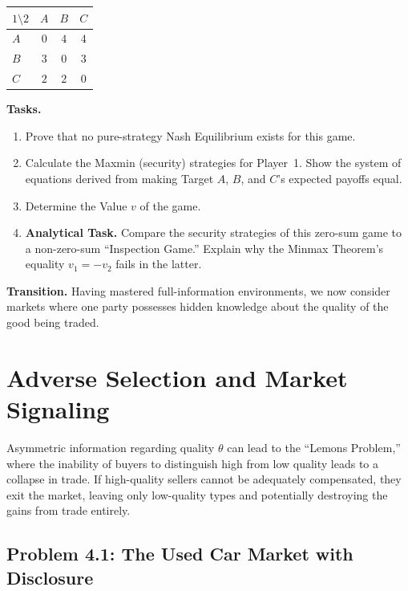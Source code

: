 \documentclass[12pt,a4paper]{article}
\begin{document}
\begin{table}[h!]
  \centering
  \renewcommand{\arraystretch}{1.1}
  \begin{tabular}{lccc}
    \toprule
    $1 \setminus 2$ & $A$ & $B$ & $C$ \\
    \midrule
    $A$ & $0$ & $4$ & $4$ \\
    $B$ & $3$ & $0$ & $3$ \\
    $C$ & $2$ & $2$ & $0$ \\
    \bottomrule
  \end{tabular}
\end{table}

\noindent\textbf{Tasks.}
\begin{enumerate}
  \item Prove that no pure-strategy Nash Equilibrium exists for this game.
  \item Calculate the Maxmin (security) strategies for Player~1. Show the system of equations derived from making Target \(A\), \(B\), and \(C\)'s expected payoffs equal.
  \item Determine the Value \(v\) of the game.
  \item \textbf{Analytical Task.} Compare the security strategies of this zero-sum game to a non-zero-sum ``Inspection Game.'' Explain why the Minmax Theorem's equality \(v_1 = -v_2\) fails in the latter.
\end{enumerate}

\bigskip
\noindent\textbf{Transition.} Having mastered full-information environments, we now consider markets where one party possesses hidden knowledge about the quality of the good being traded.

\section{Adverse Selection and Market Signaling}

Asymmetric information regarding quality \(\theta\) can lead to the ``Lemons Problem,'' where the inability of buyers to distinguish high from low quality leads to a collapse in trade. If high-quality sellers cannot be adequately compensated, they exit the market, leaving only low-quality types and potentially destroying the gains from trade entirely.

\subsection*{Problem 4.1: The Used Car Market with Disclosure}
\end{document}
